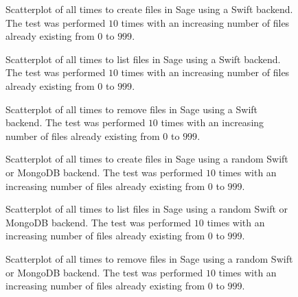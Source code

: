\begin{figure}[!h]
\centering
{}
\caption[SageSwift Create Scatterplot]{Scatterplot of all times to create files in Sage using a Swift backend. The test was performed $10$ times with an increasing number of files already existing from $0$ to $999$.}
\label{fig:sageswiftcreatescatter}
\end{figure}

\begin{figure}[!h]
\centering
{}
\caption[SageSwift List Scatterplot]{Scatterplot of all times to list files in Sage using a Swift backend. The test was performed $10$ times with an increasing number of files already existing from $0$ to $999$.}
\label{fig:sageswiftlistscatter}
\end{figure}

\begin{figure}[!h]
\centering
{}
\caption[SageSwift Remove Scatterplot]{Scatterplot of all times to remove files in Sage using a Swift backend. The test was performed $10$ times with an increasing number of files already existing from $0$ to $999$.}
\label{fig:sageswiftremovescatter}
\end{figure}

\begin{figure}[!h]
\centering
{}
\caption[SageRandom Create Scatterplot]{Scatterplot of all times to create files in Sage using a random Swift or MongoDB backend. The test was performed $10$ times with an increasing number of files already existing from $0$ to $999$.}
\label{fig:sagerandomcreatescatter}
\end{figure}

\begin{figure}[!h]
\centering
{}
\caption[SageRandom List Scatterplot]{Scatterplot of all times to list files in Sage using a random Swift or MongoDB backend. The test was performed $10$ times with an increasing number of files already existing from $0$ to $999$.}
\label{fig:sagerandomlistscatter}
\end{figure}

\begin{figure}[!h]
\centering
{}
\caption[SageRandom Remove Scatterplot]{Scatterplot of all times to remove files in Sage using a random Swift or MongoDB backend. The test was performed $10$ times with an increasing number of files already existing from $0$ to $999$.}
\label{fig:sagerandomremovescatter}
\end{figure}

